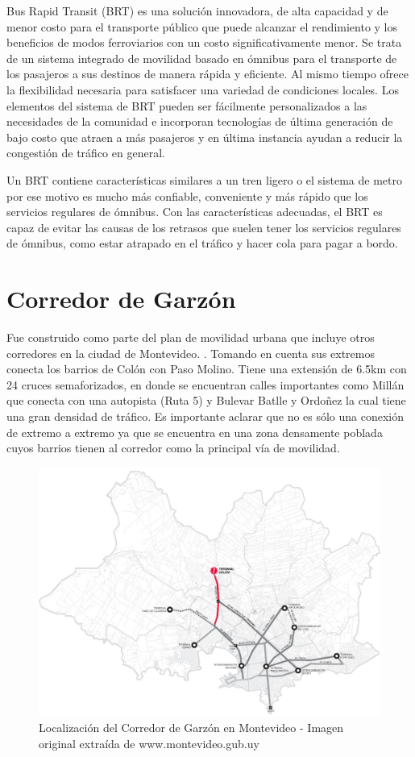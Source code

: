 Bus Rapid Transit (BRT) es una solución innovadora, de alta capacidad y de menor costo para el transporte público que puede alcanzar el rendimiento y los beneficios de modos ferroviarios con un costo significativamente menor. Se trata de un sistema integrado de movilidad basado en ómnibus para el transporte de los pasajeros a sus destinos de manera rápida y eficiente. Al mismo tiempo ofrece la flexibilidad necesaria para satisfacer una variedad de condiciones locales. Los elementos del sistema de BRT pueden ser fácilmente personalizados a las necesidades de la comunidad e incorporan tecnologías de última generación de bajo costo que atraen a más pasajeros y en última instancia ayudan a reducir la congestión de tráfico en general.

Un BRT contiene características similares a un tren ligero o el sistema de metro por ese motivo es mucho más confiable, conveniente y más rápido que los servicios regulares de ómnibus. Con las características adecuadas, el BRT es capaz de evitar las causas de los retrasos que suelen tener los servicios regulares de ómnibus, como estar atrapado en el tráfico y hacer cola para pagar a bordo. 


	
\section{Corredor de Garzón}	


Fue construido como parte del plan de movilidad urbana que incluye otros corredores en la ciudad de Montevideo. \citep{PlanMovilidad}. Tomando en cuenta sus extremos conecta los barrios de Colón con Paso Molino. Tiene una extensión de 6.5km con 24 cruces semaforizados, en donde se encuentran calles importantes como Millán que conecta con una autopista (Ruta 5) y Bulevar Batlle y Ordoñez la cual tiene una gran densidad de tráfico. Es importante aclarar que no es sólo una conexión de extremo a extremo ya que se encuentra en una zona densamente poblada cuyos barrios tienen al corredor como la principal vía de movilidad.

\begin{figure}[H]
	\centering
	\includegraphics[width=0.9\linewidth]{Figures/Mapa_Garzon_0}
	\caption{Localización del Corredor de Garzón en Montevideo - Imagen original extraída de www.montevideo.gub.uy		
	}
	\label{fig:Grafica de costos de otros medios de transporte}
\end{figure}

